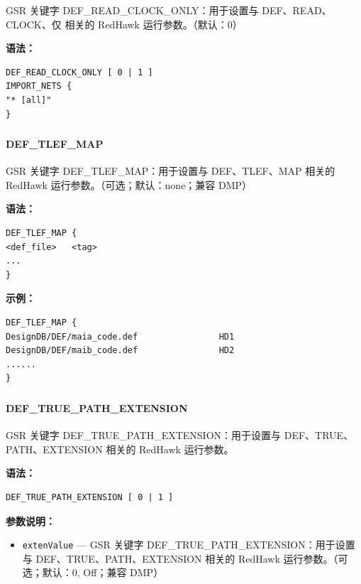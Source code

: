 GSR 关键字 DEF_READ_CLOCK_ONLY：用于设置与 DEF、READ、CLOCK、仅 相关的 RedHawk 运行参数。（默认：0）

\textbf{语法：}
\begin{lstlisting}
DEF_READ_CLOCK_ONLY [ 0 | 1 ]
IMPORT_NETS {
"* [all]"
}
\end{lstlisting}

\subsubsection{}
\paragraph*{DEF_TLEF_MAP}

GSR 关键字 DEF_TLEF_MAP：用于设置与 DEF、TLEF、MAP 相关的 RedHawk 运行参数。（可选；默认：none；兼容 DMP）

\textbf{语法：}
\begin{lstlisting}
DEF_TLEF_MAP {
<def_file>   <tag>
...
}
\end{lstlisting}

\textbf{示例：}
\begin{lstlisting}
DEF_TLEF_MAP {
DesignDB/DEF/maia_code.def                HD1
DesignDB/DEF/maib_code.def                HD2
......
}
\end{lstlisting}

\subsubsection{}
\paragraph*{DEF_TRUE_PATH_EXTENSION}

GSR 关键字 DEF_TRUE_PATH_EXTENSION：用于设置与 DEF、TRUE、PATH、EXTENSION 相关的 RedHawk 运行参数。

\textbf{语法：}
\begin{lstlisting}
DEF_TRUE_PATH_EXTENSION [ 0 | 1 ]
\end{lstlisting}

\textbf{参数说明：}
\begin{itemize}
\item \texttt{extenValue} — GSR 关键字 DEF\_TRUE\_PATH\_EXTENSION：用于设置与 DEF、TRUE、PATH、EXTENSION 相关的 RedHawk 运行参数。（可选；默认：0, Off；兼容 DMP）
\end{itemize}

